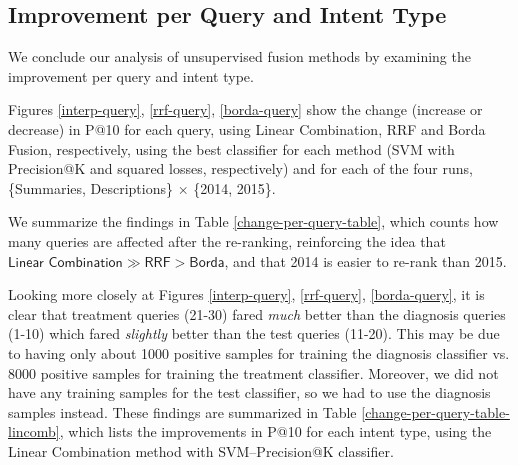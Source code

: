 \subsection{Improvement per Query and Intent Type}
We conclude our analysis of unsupervised fusion methods by examining the improvement per query and intent type.

Figures \ref{interp-query}, \ref{rrf-query}, \ref{borda-query} show the change (increase or decrease) in P@10 for each query,
using Linear Combination, RRF and Borda Fusion, respectively, using the best classifier for each method (SVM with
Precision@K and squared losses, respectively) and for each of the four runs, \{Summaries, Descriptions\} $\times$ \{2014, 2015\}.

We summarize the findings in Table \ref{change-per-query-table}, which counts
how many queries are affected after the re-ranking,
reinforcing the idea that $\textsf{Linear Combination} \gg \textsf{RRF} > \textsf{Borda}$,
and that 2014 is easier to re-rank than 2015.

\begin{table}
\centering
\caption{Number of positively/negatively affected queries for each of the three unsupervised fusion methods, using their best classifier (Tables \ref{interpolation-res}, \ref{rrf-res}
and \ref{borda-res}, respectively).}
\label{change-per-query-table}
\end{table}

Looking more closely at Figures \ref{interp-query}, \ref{rrf-query}, \ref{borda-query},
it is clear that
treatment queries (21-30) fared \emph{much} better than the diagnosis queries (1-10)
which fared \emph{slightly} better than the test queries (11-20).
This may be due to having only about 1000 positive samples for training the diagnosis classifier vs. 8000 positive samples
for training the treatment classifier. Moreover, we did not have any training samples for the test classifier,
so we had to use the diagnosis samples instead.
These findings are summarized in Table \ref{change-per-query-table-lincomb},
which lists the improvements in P@10 for each intent type, using the Linear Combination method with SVM--Precision@K
classifier.

